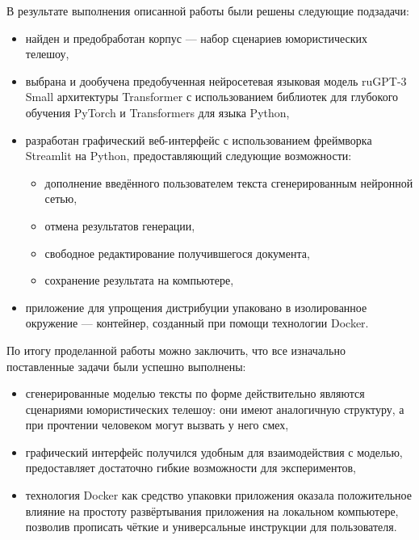\Conclusion
\label{cha:conclusion}

В результате выполнения описанной работы были решены следующие подзадачи:
\begin{itemize}
    \item найден и предобработан корпус --- набор сценариев юмористических телешоу,
    \item выбрана и дообучена предобученная нейросетевая языковая модель ruGPT-3 Small архитектуры Transformer с использованием библиотек для глубокого обучения PyTorch и Transformers для языка Python,
    \item разработан графический веб-интерфейс с использованием фреймворка Streamlit на Python, предоставляющий следующие возможности:
    \begin{itemize}[$\bullet$]
        \item дополнение введённого пользователем текста сгенерированным нейронной сетью,
        \item отмена результатов генерации,
        \item свободное редактирование получившегося документа,
        \item сохранение результата на компьютере,
    \end{itemize}
    \item приложение для упрощения дистрибуции упаковано в изолированное окружение --- контейнер, созданный при помощи технологии Docker.
\end{itemize}

По итогу проделанной работы можно заключить, что все изначально поставленные задачи были успешно выполнены:
\begin{itemize}
    \item сгенерированные моделью тексты по форме действительно являются сценариями юмористических телешоу: они имеют аналогичную структуру, а при прочтении человеком могут вызвать у него смех,
    \item графический интерфейс получился удобным для взаимодействия с моделью, предоставляет достаточно гибкие возможности для экспериментов,
    \item технология Docker как средство упаковки приложения оказала положительное влияние на простоту развёртывания приложения на локальном компьютере, позволив прописать чёткие и универсальные инструкции для пользователя.
\end{itemize}
